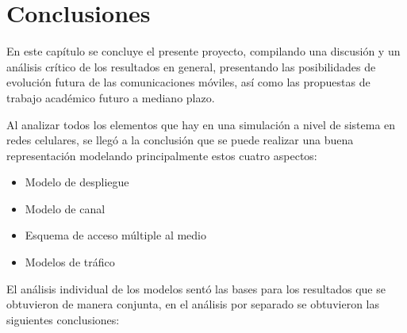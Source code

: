 
\chapter{Conclusiones} %

\label{Chapter8} %

En este capítulo se concluye el presente proyecto, compilando una discusión y un análisis crítico de los resultados en general, presentando las posibilidades de evolución futura de las comunicaciones móviles, así como las propuestas de trabajo académico futuro a mediano plazo.


Al analizar todos los elementos que hay en una simulación a nivel de sistema en redes celulares, se llegó a la conclusión que se puede realizar una buena representación modelando principalmente estos cuatro aspectos:

\begin{itemize}
    \item Modelo de despliegue
    \item Modelo de canal
    \item Esquema de acceso múltiple al medio
    \item Modelos de tráfico
\end{itemize}

El análisis individual de los modelos sentó las bases para los resultados que se obtuvieron de manera conjunta, en el análisis por separado se obtuvieron las siguientes conclusiones:


